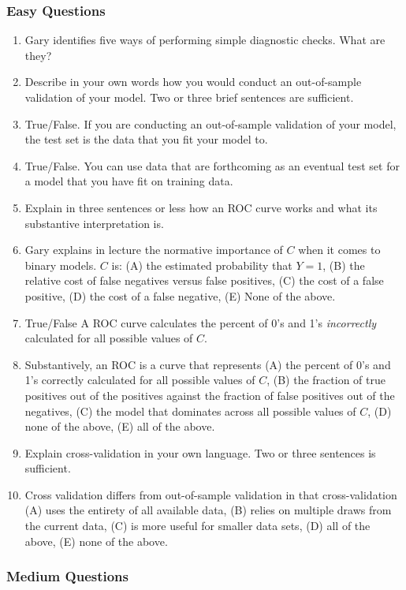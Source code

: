 \documentclass[11pt]{article}
\begin{document}
\subsubsection{Easy Questions}

\begin{enumerate}
\item Gary identifies five ways of performing simple diagnostic checks. What are they?
\item Describe in your own words how you would conduct an out-of-sample validation of your model. Two or three brief sentences are sufficient.
\item True/False. If you are conducting an out-of-sample validation of your model, the test set is the data that you fit your model to.
\item True/False.  You can use data that are forthcoming as an eventual test set for a model that you have fit on training data.
\item Explain in three sentences or less how an ROC curve works and what its substantive interpretation is.
\item Gary explains in lecture the normative importance of $C$ when it comes to binary models.  $C$ is: (A) the estimated probability that $Y=1$, (B) the relative cost of false negatives versus false positives, (C) the cost of a false positive, (D) the cost of a false negative, (E) None of the above.
\item True/False A ROC curve calculates the percent of 0's and 1's \emph{incorrectly} calculated for all possible values of $C$.
\item Substantively, an ROC is a curve that represents (A) the percent of 0's and 1's correctly calculated for all possible values of $C$, (B) the fraction of true positives out of the positives against the fraction of false positives out of the negatives, (C) the model that dominates across all possible values of $C$, (D) none of the above, (E) all of the above.
\item Explain cross-validation in your own language. Two or three sentences is sufficient.
\item Cross validation differs from out-of-sample validation in that cross-validation (A) uses the entirety of all available data, (B) relies on multiple draws from the current data, (C) is more useful for smaller data sets, (D) all of the above, (E) none of the above.
\end{enumerate}

\subsubsection{Medium Questions}
\end{document}
